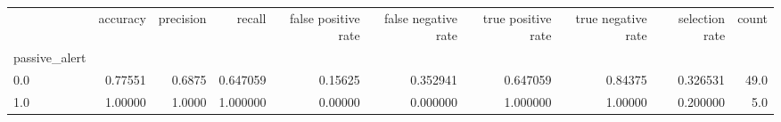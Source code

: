\begin{tabular}{lrrrrrrrrr}
\toprule
{} &  accuracy &  precision &    recall &  false positive rate &  false negative rate &  true positive rate &  true negative rate &  selection rate &  count \\
passive\_alert &           &            &           &                      &                      &                     &                     &                 &        \\
\midrule
0.0           &   0.77551 &     0.6875 &  0.647059 &              0.15625 &             0.352941 &            0.647059 &             0.84375 &        0.326531 &   49.0 \\
1.0           &   1.00000 &     1.0000 &  1.000000 &              0.00000 &             0.000000 &            1.000000 &             1.00000 &        0.200000 &    5.0 \\
\bottomrule
\end{tabular}
